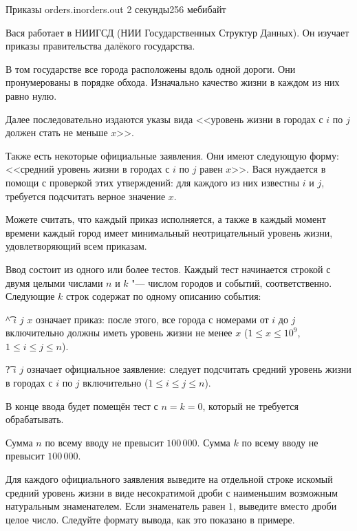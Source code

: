 %
%

\begin{problem}{Приказы}
{orders.in}{orders.out}
{2 секунды}{256 мебибайт}{}

Вася работает в НИИГСД (НИИ Государственных Структур Данных).
Он изучает приказы правительства далёкого государства.

В том государстве все города расположены вдоль одной дороги.
Они пронумерованы в порядке обхода. Изначально качество жизни
в каждом из них равно нулю.

Далее последовательно издаются указы вида <<уровень жизни
в городах с $i$ по $j$ должен стать не меньше $x$>>.

Также есть некоторые официальные заявления. Они имеют
следующую форму: <<средний уровень жизни в городах с $i$ по
$j$ равен $x$>>. Вася нуждается в помощи с проверкой этих
утверждений: для каждого из них известны $i$ и $j$, требуется
подсчитать верное значение $x$.

Можете считать, что каждый приказ исполняется, а также в каждый
момент времени каждый город имеет минимальный неотрицательный
уровень жизни, удовлетворяющий всем приказам.

\InputFile

Ввод состоит из одного или более тестов.
Каждый тест начинается строкой с двумя целыми числами $n$ и
$k$ "--- числом городов и событий, соответственно. Следующие
$k$ строк содержат по одному описанию события:

\begin{shortnums}
  \item
    \t{\^} $i$ $j$ $x$ означает приказ: после этого, все города
    с номерами от $i$ до $j$ включительно должны иметь уровень
    жизни не менее $x$ ($1 \le x \le 10^9$,
    $1 \le i \le j \le n$).
  \item
    \vskip 4pt
    \t{?} $i$ $j$ означает официальное заявление: следует
    подсчитать средний уровень жизни в городах с $i$ по $j$
    включительно ($1 \le i \le j \le n$).
\end{shortnums}

В конце ввода будет помещён тест с $n = k = 0$, который не
требуется обрабатывать.

Сумма $n$ по всему вводу не превысит $100\,000$.
Сумма $k$ по всему вводу не превысит $100\,000$.

\OutputFile

Для каждого официального заявления выведите на отдельной строке
искомый средний уровень жизни в виде несократимой дроби с
наименьшим возможным натуральным знаменателем. Если знаменатель
равен $1$, выведите вместо дроби целое число.
Следуйте формату вывода, как это показано в примере.

\Example

\begin{example}
%
\end{example}

\end{problem}
